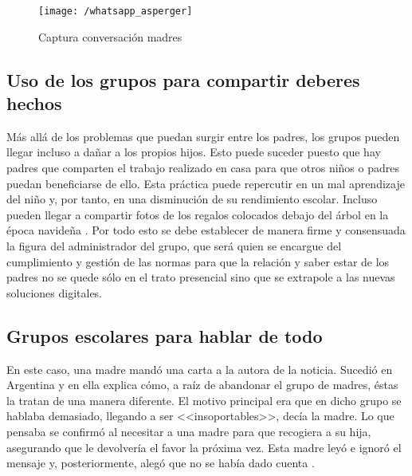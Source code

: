 \begin{figure}[!h]
	\begin{center}
		\texttt{[image: /whatsapp\_asperger]}
		\caption{Captura conversación madres}
		\label{fig:whatasper}
	\end{center}
\end{figure}

\subsection*{Uso de los grupos para compartir deberes hechos}
Más allá de los problemas que puedan surgir entre los padres, los grupos pueden llegar incluso a dañar a los propios hijos. Esto puede suceder puesto que hay padres que comparten el trabajo realizado en casa para que otros niños o padres puedan beneficiarse de ello. Esta práctica puede repercutir en un mal aprendizaje del niño y, por tanto, en una disminución de su rendimiento escolar. Incluso pueden llegar a compartir fotos de los regalos colocados debajo del árbol en la época navideña \cite{Alias2017}. Por todo esto se debe establecer de manera firme y consensuada la figura del administrador del grupo, que será quien se encargue del cumplimiento y gestión de las normas para que la relación y saber estar de los padres no se quede sólo en el trato presencial sino que se extrapole a las nuevas soluciones digitales.

\subsection*{Grupos escolares para hablar de todo}
En este caso, una madre mandó una carta a la autora de la noticia. Sucedió en Argentina y en ella explica cómo, a raíz de abandonar el grupo de madres, éstas la tratan de una manera diferente. El motivo principal era que en dicho grupo se hablaba demasiado, llegando a ser <<insoportables>>, decía la madre. Lo que pensaba se confirmó al necesitar a una madre para que recogiera a su hija, asegurando que le devolvería el favor la próxima vez. Esta madre leyó e ignoró el mensaje y, posteriormente, alegó que no se había dado cuenta \cite{Consuelo2017}.

